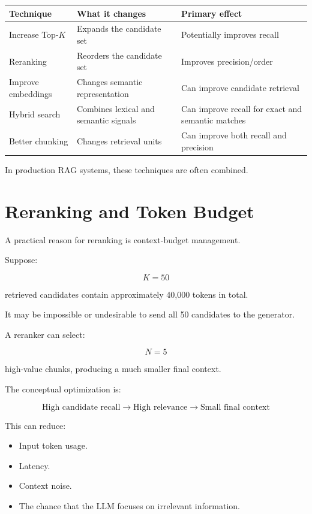 \documentclass[12pt, a4paper]{article}
\begin{document}
\begin{longtable}{p{}p{}p{}}
\toprule
\textbf{Technique} & \textbf{What it changes} & \textbf{Primary effect}\\
\midrule
Increase Top-$K$ & Expands the candidate set & Potentially improves recall\\
Reranking & Reorders the candidate set & Improves precision/order\\
Improve embeddings & Changes semantic representation & Can improve candidate retrieval\\
Hybrid search & Combines lexical and semantic signals & Can improve recall for exact and semantic matches\\
Better chunking & Changes retrieval units & Can improve both recall and precision\\
\bottomrule
\end{longtable}

In production RAG systems, these techniques are often combined.

\section{Reranking and Token Budget}

A practical reason for reranking is context-budget management.

Suppose:

\[
K=50
\]

retrieved candidates contain approximately 40,000 tokens in total.

It may be impossible or undesirable to send all 50 candidates to the generator.

A reranker can select:

\[
N=5
\]

high-value chunks, producing a much smaller final context.

The conceptual optimization is:

\[
\text{High candidate recall}
\longrightarrow
\text{High relevance}
\longrightarrow
\text{Small final context}
\]

This can reduce:

\begin{itemize}
    \item Input token usage.
    \item Latency.
    \item Context noise.
    \item The chance that the LLM focuses on irrelevant information.
\end{itemize}
\end{document}
